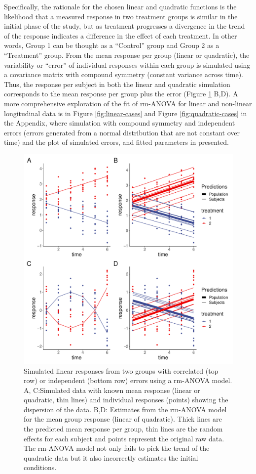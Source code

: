 \documentclass[
]{article}
\begin{document}
Specifically, the rationale for the chosen linear and quadratic functions is the likelihood that a measured response in two treatment groups is similar in the initial phase of the study, but as treatment progresses a divergence in the trend of the response indicates a difference in the effect of each treatment. In other words, Group 1 can be thought as a ``Control'' group and Group 2 as a ``Treatment'' group. From the mean response per group (linear or quadratic), the variability or ``error'' of individual responses within each group is simulated using a covariance matrix with compound symmetry (constant variance across time). Thus, the response per subject in both the linear and quadratic simulation corresponds to the mean response per group plus the error (Figure \ref{fig:l-q-response} B,D). A more comprehensive exploration of the fit of rm-ANOVA for linear and non-linear longitudinal data is in Figure \ref{fig:linear-cases} and Figure \ref{fig:quadratic-cases} in the Appendix, where simulation with compound symmetry and independent errors (errors generated from a normal distribution that are not constant over time) and the plot of simulated errors, and fitted parameters in presented.

\begin{figure}[!h]

{\centering \includegraphics[width=0.75\linewidth,]{Manuscript_AM_v4_files/figure-latex/l-q-response-1} 

}

\caption{Simulated linear responses from two groups with correlated (top row) or independent (bottom row) errors using a rm-ANOVA model. A, C:Simulated data with known mean response (linear or quadratic, thin lines) and individual responses (points) showing the dispersion of the data. B,D: Estimates from the rm-ANOVA model for the mean group response (linear of quadratic). Thick lines are the predicted mean response per group, thin lines are the random effects for each subject and points represent the original raw data. The rm-ANOVA model not only fails to pick the trend of the quadratic data but it also incorrectly estimates the initial conditions.}\label{fig:l-q-response}
\end{figure}
\end{document}

